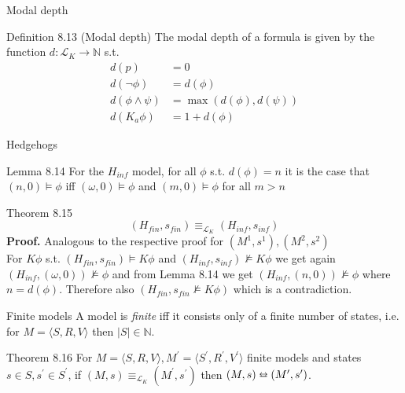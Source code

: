 \documentclass{beamer}
\newcommand{\lang}{\mathcal{L}}
\begin{document}
\begin{frame}{Modal depth}
	\begin{block}{Definition 8.13 (Modal depth)}
		The modal depth of a formula is given by the function $d:\lang_K \rightarrow \mathbb{N}$ s.t.
		\begin{align*}
			d(p) &= 0\\
			d(\neg \phi) &= d(\phi)\\
			d(\phi \wedge \psi) &= \max(d(\phi),d(\psi))\\
			d(K_a\phi) &= 1 + d(\phi)
		\end{align*}
	\end{block}
\end{frame}

\begin{frame}{Hedgehogs}
	\begin{block}{Lemma 8.14}
		For the $H_{inf}$ model, for all $\phi$ s.t. $d(\phi)=n$ it is the case that\\
		$(n,0) \models \phi$ iff $(\omega,0) \models \phi$ and $(m,0) \models \phi$ for all $m>n$
	\end{block} \pause
	\begin{block}{Theorem 8.15}
		\[(H_{fin},s_{fin}) \equiv_{\lang_K} (H_{inf},s_{inf})\]
		\textbf{Proof.} Analogous to the respective proof for $(M^1,s^1),(M^2,s^2)$\\
		For $K \phi$ s.t. $(H_{fin},s_{fin}) \models K \phi$ and $(H_{inf},s_{inf}) \not\models K \phi$ we get again $(H_{inf},(\omega,0)) \not\models \phi$ and from Lemma 8.14 we get $(H_{inf},(n,0)) \not\models \phi$ where $n=d(\phi)$.
		Therefore also $(H_{fin},s_{fin} \not\models K \phi)$ which is a contradiction.
	\end{block}
\end{frame}

\begin{frame}{Finite models}
	A model is \textit{finite} iff it consists only of a finite number of states, i.e. for $M = \langle S,R,V \rangle$ then $|S| \in \mathbb{N}$.
	\begin{block}{Theorem 8.16}
		For $M=\langle S,R,V \rangle, M^\prime=\langle S^\prime,R^\prime,V^\prime \rangle$ finite models and states $s \in S, s^\prime \in S^\prime$, if $(M,s) \equiv_{\lang_K} (M^\prime,s^\prime)$ then $(M,s) \leftrightarroweq (M^\prime,s^\prime)$.
	\end{block}
\end{frame}
\end{document}
